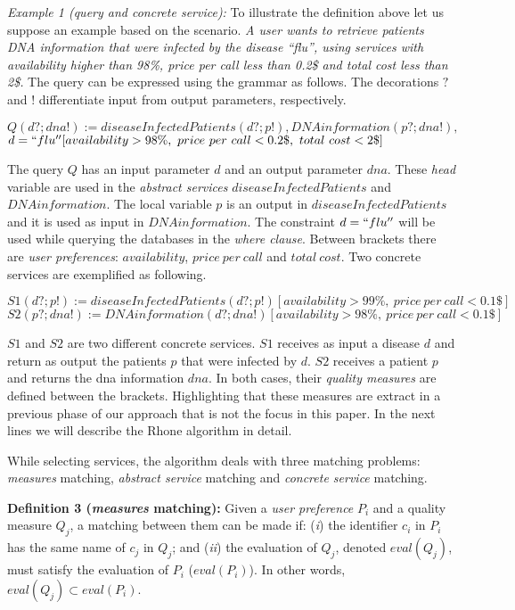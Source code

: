 \bigskip
\noindent \textit{Example 1 (query and concrete service):} To illustrate the definition above let us suppose an example based on the scenario. 
\textit{A user wants to retrieve patients DNA information that were infected by the disease ``flu'', using services with availability higher than 98\%, price per call less than 0.2\$ and total cost less than 2\$.}
The query can be expressed using the grammar as follows. The decorations $?$ and $!$ differentiate input from output parameters, respectively. 
\begin{center}
$Q(d?; dna!) := diseaseInfectedPatients(d?; p!), DNAinformation(p?; dna!),$
\\
$d = ``flu'' [availability > 98\%, \ price \ per \ call < 0.2\$, \ total \ cost < 2\$]$
\end{center}
The query $Q$ has an input parameter $d$ and an output parameter $dna$. 
These \textit{head} variable are used in the \textit{abstract services} $diseaseInfectedPatients$ and $DNAinformation$. 
The local variable $p$ is an output in $diseaseInfectedPatients$ and it is used as input in $DNAinformation$.
The constraint $d = ``flu''$ will be used while querying the databases in the \textit{where clause}.
Between brackets there are \textit{user preferences}: $availability$, $price \ per \ call$ and $total \ cost$.
Two concrete services are exemplified as following. 
\begin{center}
\small
$S1(d?; p!) := diseaseInfectedPatients(d?; p!)[availability > 99\%, \ price \ per \ call < 0.1\$]$ 
\\
$S2(p?; dna!) := DNAinformation(d?; dna!)[availability > 98\%, \ price \ per \ call < 0.1\$]$
\end{center}
$S1$ and $S2$ are two different concrete services. $S1$ receives as input a disease $d$ and return as output the patients $p$ that were infected by $d$. 
$S2$ receives a patient $p$ and returns the dna information $dna$. In both cases, their \textit{quality measures} are defined between the brackets. Highlighting that these measures are extract in a previous phase of our approach that is not the focus in this paper. In the next lines we will describe the Rhone algorithm in detail.
 
While selecting services, the algorithm deals with three matching problems: \textit{measures} matching, \textit{abstract service} matching and \textit{concrete service} matching.

\noindent \textbf{Definition 3 (\textit{measures} matching):} 
Given a \textit{user preference} $P_{i}$ and a quality measure $Q_{j}$, a matching between them can be made if:
(\textit{i}) the identifier $c_{i}$ in $P_{i}$ has the same name of $c_{j}$ in $Q_{j}$; and
(\textit{ii}) the evaluation of $Q_{j}$, denoted $eval(Q_{j})$, must satisfy the evaluation of $P_{i}$ ($eval(P_{i})$). In other words, $eval(Q_{j}) \subset eval(P_{i})$.

